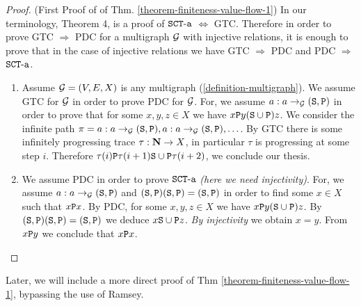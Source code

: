 \documentclass{lmcs}
\begin{document}
\begin{proof}(First Proof of of Thm. \ref{theorem-finiteness-value-flow-1})
In our terminology, Theorem 4, \cite{Lee1} is a proof of  
$\SCTa$ $\Leftrightarrow$ GTC. 
Therefore in order to prove GTC $\Rightarrow$ PDC for a multigraph $\setG$
with injective relations, it is enough to prove that in the case of injective relations
we have GTC $\Rightarrow$ PDC and PDC $\Rightarrow$ $\SCTa$.

\begin{enumerate}

\item
Assume $\setG = (V,E,X)$ is any multigraph (\ref{definition-multigraph}).
We assume GTC for $\setG$ in order to prove PDC for $\setG$. For,
we assume $\composable{\setG}{a}{(\Stat,\Prog)}{a}$ in order to prove that
for some $x,y,z \in X$ we have $x \Prog y (\Stat \cup \Prog) z$. We consider the infinite path 
$\pi =  \composable{\setG}{a}{(\Stat,\Prog)}{a}, \composable{\setG}{a}{(\Stat,\Prog)}{a}, 
\ldots$. By GTC there is some infinitely progressing trace $\tau:\N \rightarrow X$, 
in particular $\tau$ is progressing at some step $i$. Therefore
$\tau(i) \Prog \tau(i+1) \Stat \cup \Prog \tau(i+2)$, we conclude our thesis. 

\item
We assume PDC in order to prove $\SCTa$ \emph{(here we need injectivity)}.
For, we assume $\composable{\setG}{a}{(\Stat,\Prog)}{a}$ and 
$(\Stat,\Prog)(\Stat,\Prog) = (\Stat,\Prog)$ in order to find some $x \in X$ such 
that $x \Prog x$. By PDC, for some $x,y,z \in X$ we have $x \Prog y (\Stat \cup \Prog) z$. 
By $(\Stat,\Prog)(\Stat,\Prog) = (\Stat,\Prog)$ we deduce $x \Stat \cup \Prog z$.
\emph{By injectivity} we obtain $x=y$. From $x \Prog y$ we conclude that $x \Prog x$.

\end{enumerate}
\end{proof}

Later, we will include  a more direct proof of Thm \ref{theorem-finiteness-value-flow-1}, 
bypassing the use of Ramsey.

\end{document}
